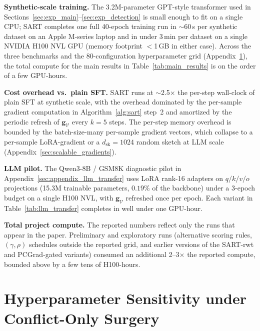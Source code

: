 \textbf{Synthetic-scale training.} The 3.2M-parameter GPT-style transformer used in Sections~\ref{sec:exp_main}--\ref{sec:exp_detection} is small enough to fit on a single CPU; SART completes one full 40-epoch training run in $\sim$60\,s per synthetic dataset on an Apple M-series laptop and in under 3\,min per dataset on a single NVIDIA H100 NVL GPU (memory footprint $<$1\,GB in either case). Across the three benchmarks and the 80-configuration hyperparameter grid (Appendix~\ref{sec:appendix_sensitivity}), the total compute for the main results in Table~\ref{tab:main_results} is on the order of a few GPU-hours.

\textbf{Cost overhead vs.\ plain SFT.} SART runs at $\sim$2.5$\times$ the per-step wall-clock of plain SFT at synthetic scale, with the overhead dominated by the per-sample gradient computation in Algorithm~\ref{alg:sart} step~2 and amortized by the periodic refresh of $\mathbf{g}_{\mathcal{V}}$ every $k{=}5$ steps. The per-step memory overhead is bounded by the batch-size-many per-sample gradient vectors, which collapse to a per-sample LoRA-gradient or a $d_{\mathrm{sk}}{=}1024$ random sketch at LLM scale (Appendix~\ref{sec:scalable_gradients}).

\textbf{LLM pilot.} The Qwen3-8B / GSM8K diagnostic pilot in Appendix~\ref{sec:appendix_llm_transfer} uses LoRA rank-16 adapters on $q/k/v/o$ projections (15.3M trainable parameters, $0.19\%$ of the backbone) under a 3-epoch budget on a single H100 NVL, with $\mathbf{g}_{\mathcal{V}}$ refreshed once per epoch. Each variant in Table~\ref{tab:llm_transfer} completes in well under one GPU-hour.

\textbf{Total project compute.} The reported numbers reflect only the runs that appear in the paper. Preliminary and exploratory runs (alternative scoring rules, $(\gamma,\rho)$ schedules outside the reported grid, and earlier versions of the SART-rwt and PCGrad-gated variants) consumed an additional 2--3$\times$ the reported compute, bounded above by a few tens of H100-hours.

\section{Hyperparameter Sensitivity under Conflict-Only Surgery}
\label{sec:appendix_sensitivity}

